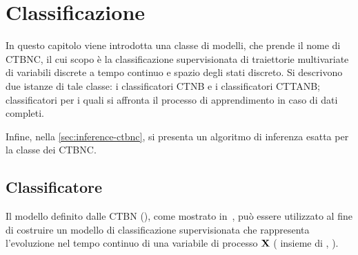 
\chapter{Classificazione}
\label{cap:ctbnc}
In questo capitolo viene introdotta una classe di modelli, che prende il nome di \acf{CTBNC}, il cui scopo è la classificazione supervisionata di traiettorie multivariate di variabili discrete a tempo continuo e spazio degli stati discreto. Si descrivono due istanze di tale classe: i classificatori \acf{CTNB} e i classificatori \acf{CTTANB}; classificatori per i quali si affronta il processo di apprendimento in caso di dati completi.

Infine, nella \autoref{sec:inference-ctbnc}, si presenta un algoritmo di inferenza esatta per la classe dei \acs{CTBNC}.

\section{Classificatore}\label{sec:ctbnc}
Il modello definito dalle \acl{CTBN} (), come mostrato in~\citet{Stella2012}, può essere utilizzato al fine di costruire un modello di classificazione supervisionata che rappresenta l'evoluzione nel tempo continuo di una variabile di processo $\mathbf{X}$ (\ie{} insieme di \mprocess{}, ).

